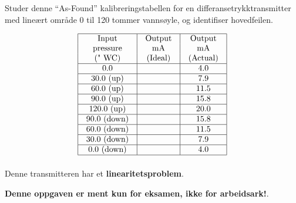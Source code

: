 

Studer denne ``As-Found'' kalibreringstabellen for en differansetrykktransmitter med lineært område 0 til 120 tommer vannsøyle, og identifiser hovedfeilen.


$$\vbox{\offinterlineskip
\halign{\strut
\vrule \quad\hfil # \ \hfil & 
\vrule \quad\hfil # \ \hfil & 
\vrule \quad\hfil # \ \hfil \vrule \cr
\noalign{\hrule}
%
Input & Output & Output \cr
%
pressure & mA & mA \cr
%
(" WC) & (Ideal) & (Actual) \cr
%
\noalign{\hrule}
%
0.0 & & 4.0 \cr
%
\noalign{\hrule}
%
30.0 (up) & & 7.9 \cr
%
\noalign{\hrule}
%
60.0 (up) & & 11.5 \cr
%
\noalign{\hrule}
%
90.0 (up) & & 15.8 \cr
%
\noalign{\hrule}
%
120.0 (up) & & 20.0 \cr
%
\noalign{\hrule}
%
90.0 (down) & & 15.8 \cr
%
\noalign{\hrule}
%
60.0 (down) & & 11.5 \cr
%
\noalign{\hrule}
%
30.0 (down) & & 7.9 \cr
%
\noalign{\hrule}
%
0.0 (down) & & 4.0 \cr
%
\noalign{\hrule}
} %
}$$ %







Denne transmitteren har et {\bf linearitetsproblem}.







{\bf Denne oppgaven er ment kun for eksamen, ikke for arbeidsark!}.


